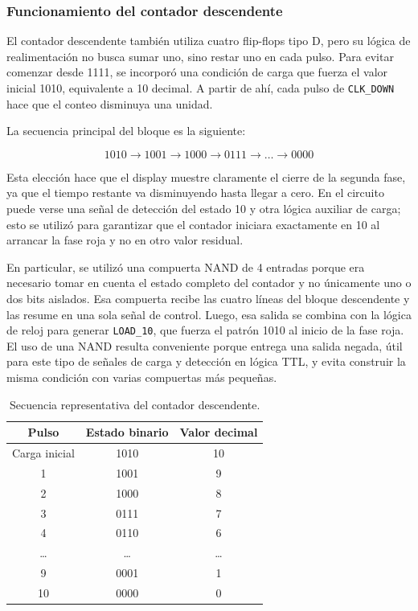 \documentclass[12pt,a4paper]{article}
\begin{document}
\subsubsection{Funcionamiento del contador descendente}
El contador descendente también utiliza cuatro flip-flops tipo D, pero su lógica de realimentación no busca sumar uno, sino restar uno en cada pulso. Para evitar comenzar desde 1111, se incorporó una condición de carga que fuerza el valor inicial 1010, equivalente a 10 decimal. A partir de ahí, cada pulso de \texttt{CLK\_DOWN} hace que el conteo disminuya una unidad.

La secuencia principal del bloque es la siguiente:

\[
1010 \rightarrow 1001 \rightarrow 1000 \rightarrow 0111 \rightarrow \dots \rightarrow 0000
\]

Esta elección hace que el display muestre claramente el cierre de la segunda fase, ya que el tiempo restante va disminuyendo hasta llegar a cero. En el circuito puede verse una señal de detección del estado 10 y otra lógica auxiliar de carga; esto se utilizó para garantizar que el contador iniciara exactamente en 10 al arrancar la fase roja y no en otro valor residual.

En particular, se utilizó una compuerta NAND de 4 entradas porque era necesario tomar en cuenta el estado completo del contador y no únicamente uno o dos bits aislados. Esa compuerta recibe las cuatro líneas del bloque descendente y las resume en una sola señal de control. Luego, esa salida se combina con la lógica de reloj para generar \texttt{LOAD\_10}, que fuerza el patrón 1010 al inicio de la fase roja. El uso de una NAND resulta conveniente porque entrega una salida negada, útil para este tipo de señales de carga y detección en lógica TTL, y evita construir la misma condición con varias compuertas más pequeñas.

\begin{table}[H]
    \centering
    \caption{Secuencia representativa del contador descendente.}
    \begin{tabular}{c c c}
        \toprule
        \textbf{Pulso} & \textbf{Estado binario} & \textbf{Valor decimal} \\
        \midrule
        Carga inicial & 1010 & 10 \\
        1 & 1001 & 9 \\
        2 & 1000 & 8 \\
        3 & 0111 & 7 \\
        4 & 0110 & 6 \\
        \dots & \dots & \dots \\
        9 & 0001 & 1 \\
        10 & 0000 & 0 \\
        \bottomrule
    \end{tabular}
\end{table}
\end{document}
